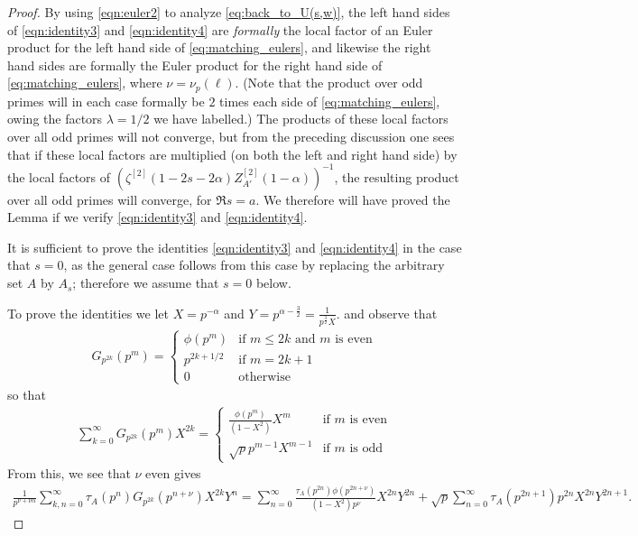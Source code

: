 \documentclass[12pt]{amsart}
\begin{document}
\begin{proof}
		By using \eqref{eqn:euler2} to analyze \eqref{eq:back_to_U(s,w)}, the left hand sides of \eqref{eqn:identity3} and \eqref{eqn:identity4} are \emph{formally} the local factor of an Euler product for the left hand side of \eqref{eq:matching_eulers}, and likewise the right hand sides are formally the Euler product for the right hand side of \eqref{eq:matching_eulers}, where $\nu = \nu_p(\ell)$. (Note that the product over odd primes will in each case formally be $2$ times each side of \eqref{eq:matching_eulers}, owing the factors $\lambda = 1/2$ we have labelled.) The products of these local factors over all odd primes will not converge, but from the preceding discussion one sees that if these local factors are multiplied (on both the left and right hand side) by the local factors of $(\zeta^{[2]}(1-2s-2\alpha) Z_{A'}^{[2]}(1-\alpha))^{-1}$, the resulting product over all odd primes will converge, for $\Re s = a$. We therefore will have proved the Lemma if we verify \eqref{eqn:identity3} and \eqref{eqn:identity4}. 
		
		It is sufficient to prove the identities \eqref{eqn:identity3} and \eqref{eqn:identity4} in the case that $s=0$, as the general case follows from this case 
		by replacing the arbitrary set $A$ by $A_s$; therefore we assume that $s=0$ below. 
		
		To prove the identities we let $X=p^{-\alpha}$ and $Y=p^{\alpha-\frac 32}  = \frac{1}{p^{\frac 32}X}$.
		and   observe that 
		\begin{eqnarray*}
			G_{p^{2k}}(p^{m}) =\left\{ \begin{array}{ll}
				\phi(p^m) & \mbox{if $m\le 2k $ and $m$  is even} \\
				p^{2k+1/2} &  \mbox{if $m=2k+1$}\\
				0 & \mbox{otherwise} \end{array} \right.
		\end{eqnarray*}
		so that 
		\begin{eqnarray*}
			\sum_{k=0}^\infty  G_{p^{2k}}(p^{m})X^{2k}=\left\{ \begin{array}{ll}
				\frac{\phi(p^m)}{(1-X^2)} X^m & \mbox{if $m$ is even} \\
				\sqrt{p}   p^{m-1}X^{m-1} &  \mbox{if $m$ is odd} \end{array} \right. 
		\end{eqnarray*}
		From this, we see that $\nu $ even gives 
		\begin{eqnarray*} \frac{1}{p^{\nu+\nu \alpha}}
			\sum_{k,n=0}^\infty 
			\tau_A(p^n)G_{p^{2k}}(p^{n+\nu}) X^{2k}Y^n=
			\sum_{n=0}^\infty 
			\frac{\tau_A(p^{2n})\phi(p^{2n+\nu})}{(1-X^2)p^\nu} X^{2n}Y^{2n}+\sqrt{p}\sum_{n=0}^\infty     \tau_A(p^{2n+1}) p^{2n}X^{2n}Y^{2n+1} .
		\end{eqnarray*}
		

\end{proof}
\end{document}
